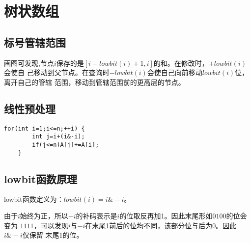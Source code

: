 \section{树状数组}
\subsection{标号管辖范围}

画图可发现,节点$i$保存的是$[i-lowbit(i)+1,i]$的和。在修改时，$+lowbit(i)$会使自
己移动到父节点。在查询时$-lowbit(i)$会使自己向前移动$lowbit(i)$位，离开自己的管辖
范围，移动到管辖范围前的更高层的节点。

\subsection{线性预处理}

\begin{lstlisting}[title=LinearBuild]
    for(int i=1;i<=n;++i) {
        int j=i+(i&-i);
        if(j<=n)A[j]+=A[i];
    }
\end{lstlisting}

\subsection{lowbit函数原理}

lowbit函数定义为：$lowbit(i)=i\&-i$。

由于$i$始终为正，所以$-i$的补码表示是$i$的位取反再加1。因此末尾形如$0100$的位会变为
$1111$，可以发现$i$与$-i$在末尾1前后的位均不同，该部分位与后为0。因此$i\&-i$仅保留
末尾1的位。
